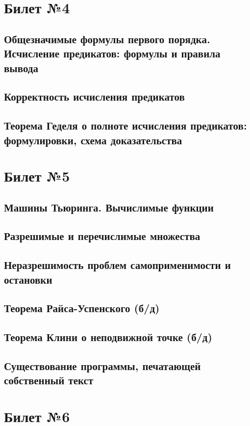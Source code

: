 \documentclass[a4paper]{article}
\theoremstyle{plain}
\theoremstyle{remark}
\theoremstyle{definition}
\begin{document}
\section{Билет №4}
\subsection{Общезначимые формулы первого порядка. Исчисление предикатов: формулы и правила вывода}
\subsection{Корректность исчисления предикатов}
\subsection{Теорема Геделя о полноте исчисления предикатов: формулировки, схема доказательства}

\section{Билет №5}
\subsection{Машины Тьюринга. Вычислимые функции}
\subsection{Разрешимые и перечислимые множества}
\subsection{Неразрешимость проблем самоприменимости и остановки}
\subsection{Теорема Райса-Успенского (б/д)}
\subsection{Теорема Клини о неподвижной точке (б/д)}
\subsection{Существование программы, печатающей собственный текст}

\section{Билет №6}
\end{document}
